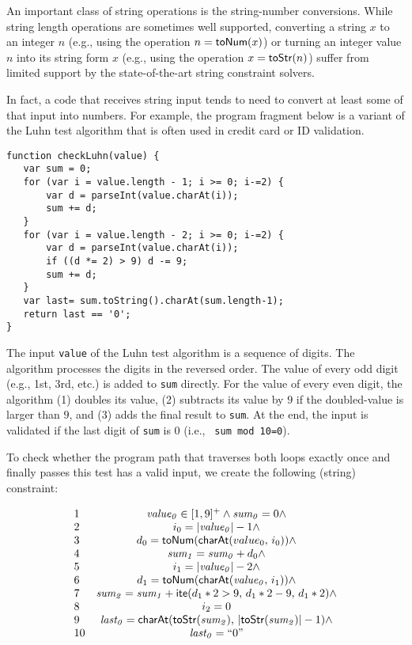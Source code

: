 \documentclass[sigplan,screen]{acmart}
\begin{document}
An important class of string operations is  the string-number conversions.  While string length operations are sometimes well supported, converting a string $x$ to an integer $n$ (e.g., using the operation $n = \mbox{\textsf{toNum}($x$)}$) or turning an integer value $n$ into its string form $x$ (e.g., using the operation $x = \mbox{\textsf{toStr}($n$)}$)  suffer from  limited support by the state-of-the-art string constraint solvers. 


In fact, a code that receives string input tends to need to convert at least some of that input into numbers.
For example, the program fragment below is a variant of the Luhn test algorithm that is often used in credit card or ID validation.



\begin{Verbatim}[fontsize=\small]
function checkLuhn(value) {
   var sum = 0;
   for (var i = value.length - 1; i >= 0; i-=2) {
       var d = parseInt(value.charAt(i));
       sum += d;
   }	
   for (var i = value.length - 2; i >= 0; i-=2) {
       var d = parseInt(value.charAt(i));
       if ((d *= 2) > 9) d -= 9;
       sum += d;
   }
   var last= sum.toString().charAt(sum.length-1);
   return last == '0';
}
\end{Verbatim}


The input \verb|value| of the Luhn test algorithm is a sequence of digits. The algorithm processes the digits in the reversed order. The value of every odd digit (e.g., 1st, 3rd, etc.) is added to \verb|sum| directly. For the value of every even digit, the algorithm (1) doubles its value, (2) subtracts its value by $9$ if the doubled-value is larger than $9$, and (3) adds the final result to \verb|sum|. At the end, the input is validated if the last digit of \verb|sum| is $0$ (i.e., \verb| sum mod 10=0|).

To check whether the program path that traverses both loops exactly once and finally passes this test has a valid input, we create the following (string) constraint:

$$\begin{array}{lc}
1&	{\it value_0} \in [1,9]^+ \wedge 	{\it sum_0} = 0 \wedge \\
2&	i_0 = |{\it value_0}| -1 \wedge \\
3&	d_0 = \mbox{\textsf{toNum}($\mbox{\textsf{charAt}($value_0$, $i_0$)}$)} \wedge \\
4&	{\it sum_1} = {\it sum_0} + d_0 \wedge\\
5&	i_1 = |{\it value_0}| -2 \wedge \\
6&	d_1 = \mbox{\textsf{toNum}($\mbox{\textsf{charAt}(${\it value_0}$, $i_1$)}$)} \wedge \\
7&	{\it sum_2} = {\it sum_1} + \mbox{\textsf{ite}($d_1*2>9$, $d_1*2 -9$, $d_1*2$)} \wedge\\
8& i_2 = 0\\
9&	{\it last_0} = \mbox{\textsf{charAt}($\mbox{\textsf{toStr}(${\it sum_2}$)}$, $|\mbox{\textsf{toStr}(${\it sum_2}$)}|-1$)} \wedge\\
10&	{\it last_0} =``0"
\end{array}$$
\end{document}
